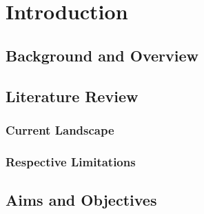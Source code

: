 \label{chapter-introduction}
\chapter{Introduction}

\section{Background and Overview}

\section{Literature Review}

\subsection{Current Landscape}

\subsection{Respective Limitations}

\section{Aims and Objectives}

